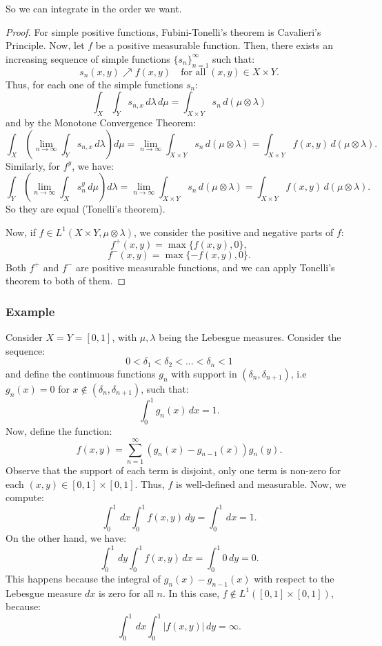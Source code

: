 \documentclass[11pt]{article}
\begin{document}
So we can integrate in the order we want.

\begin{proof}
For simple positive functions, Fubini-Tonelli's theorem is Cavalieri's Principle. Now, let \(f\) be a positive measurable function. Then, there exists an increasing sequence of simple functions \(\{s_n\}_{n=1}^{\infty}\) such that:
\[s_n(x, y) \nearrow f(x, y) \quad \text{for all } (x, y) \in X \times Y.\]
Thus, for each one of the simple functions \(s_n\):
\[\int_X \int_Y s_{n, x} \,d\lambda \,d\mu = \int_{X \times Y} s_n \,d(\mu \otimes \lambda) \]
and by the Monotone Convergence Theorem:
\[\int_X \left(\lim_{n \to \infty} \int_Y s_{n, x} \,d\lambda\right) d\mu = \lim_{n \to \infty} \int_{X \times Y} s_n \,d(\mu \otimes \lambda) = \int_{X \times Y} f(x, y) \,d(\mu \otimes \lambda).\]
Similarly, for \(f^y\), we have:
\[\int_Y \left(\lim_{n \to \infty} \int_X s_n^y \,d\mu\right) d\lambda = \lim_{n \to \infty} \int_{X \times Y} s_n \,d(\mu \otimes \lambda) = \int_{X \times Y} f(x, y) \,d(\mu \otimes \lambda).\]
So they are equal (Tonelli's theorem).

Now, if \(f \in L^1(X \times Y, \mu \otimes \lambda)\), we consider the positive and negative parts of \(f\):
\[f^+(x, y) = \max\{f(x, y), 0\},\]
\[f^-(x, y) = \max\{-f(x, y), 0\}.\]
Both \(f^+\) and \(f^-\) are positive measurable functions, and we can apply Tonelli's theorem to both of them.
\end{proof}

\subsubsection*{Example}
Consider \(X = Y = [0, 1]\), with \(\mu, \lambda\) being the Lebesgue measures. Consider the sequence:
\[0 < \delta_1 < \delta_2 < \ldots < \delta_n < 1\]
and define the continuous functions \(g_n\) with support in \((\delta_n, \delta_{n+1})\), i.e \(g_n(x) = 0\) for \(x \notin (\delta_n, \delta_{n+1})\), such that:
\[\int_0^1 g_n(x) \,dx = 1.\]
Now, define the function:
\[f(x, y) = \sum_{n=1}^{\infty} \left(g_n(x) - g_{n-1}(x)\right) g_n(y).\]
Observe that the support of each term is disjoint, only one term is non-zero for each \((x, y) \in [0, 1] \times [0, 1]\). Thus, \(f\) is well-defined and measurable. Now, we compute:
\[\int_0^1 \,dx \int_0^1 f(x, y) \,dy = \int_0^1 \,dx = 1.\]
On the other hand, we have:
\[\int_0^1 \,dy \int_0^1 f(x, y) \,dx = \int_0^1 0 \,dy = 0.\]
This happens because the integral of \(g_n(x) - g_{n-1}(x)\) with respect to the Lebesgue measure \(dx\) is zero for all \(n\).
In this case, \(f \notin L^1([0, 1] \times [0, 1])\), because:
\[\int_0^1 \,dx \int_0^1 |f(x, y)| \,dy = \infty.\]
\end{document}
